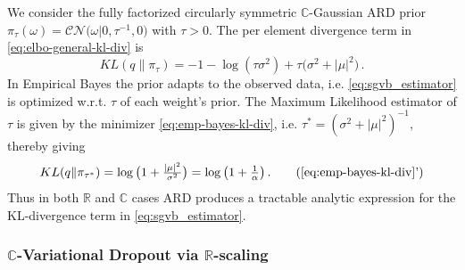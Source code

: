 \documentclass[a4paper,10pt,twocolumn]{article}
\newcommand{\real}{\mathbb{R}}
\newcommand{\cplx}{\mathbb{C}}
\newcommand{\tr}[1]{\mathop{tr}{#1}}
\begin{document}
We consider the fully factorized circularly symmetric $\cplx$-Gaussian ARD prior $
  \pi_\tau(\omega)
    = \mathcal{CN}\bigl(
      \omega \vert 0, \tau^{-1}, 0
    \bigr)
$ with $\tau > 0$. The per element divergence term in \eqref{eq:elbo-general-kl-div} is
\begin{equation}  \label{eq:emp-bayes-kl-div}
  KL(q \| \pi_\tau)
    = - 1 - \log{(\tau \sigma^2)}
      + \tau \bigl(
        \sigma^2 + \lvert \mu \rvert^2
      \bigr)
    \,.
\end{equation}
%
%
In Empirical Bayes the prior adapts to the observed data, i.e. \eqref{eq:sgvb_estimator}
is optimized w.r.t. $\tau$ of each weight's prior. The Maximum Likelihood estimator
of $\tau$ is given by the minimizer \eqref{eq:emp-bayes-kl-div}, i.e. $
  \tau^\ast = (\sigma^2 + \lvert \mu \rvert^2)^{-1}
$, thereby giving
\begin{equation}  \label{eq:emp-bayes-opt-kl}
  KL(q \| \pi_{\tau^\ast})
    = \log{\bigl(1 + \tfrac{\lvert \mu \rvert^2}{\sigma^2}\bigr)}
    = \log{\bigl(1 + \tfrac1\alpha \bigr)}
    \,.
    \tag{\ref{eq:emp-bayes-kl-div}'}
\end{equation}
Thus in both $\real$ and $\cplx$ cases ARD produces a tractable analytic expression for
the KL-divergence term in \eqref{eq:sgvb_estimator}.


\subsubsection{$\cplx$-Variational Dropout via $\real$-scaling} %
\label{ssub:real_scaling_dropout}
\end{document}
